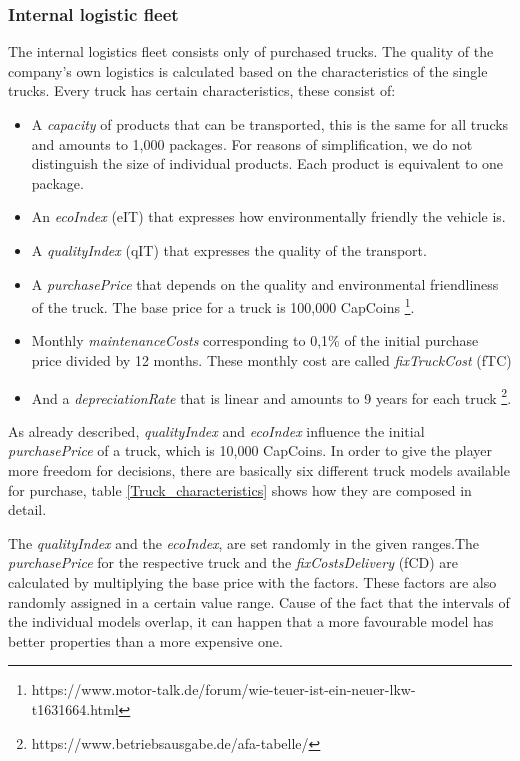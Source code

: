 \subsubsection{Internal logistic fleet}
The internal logistics fleet consists only of purchased trucks. The quality of the company's own logistics is calculated based on the characteristics of the single trucks. Every truck has certain characteristics, these consist of:
\begin{itemize}
    \item A \textit{capacity} of products that can be transported, this is the same for all trucks and amounts to 1,000 packages. For reasons of simplification, we do not distinguish the size of individual products.  Each product is equivalent to one package. 
    \item An \textit{ecoIndex} (\gls{eIT}) that expresses how environmentally friendly the vehicle is.
    \item A \textit{qualityIndex} (\gls{qIT}) that expresses the quality of the transport.
    \item A \textit{purchasePrice} that depends on the quality and environmental friendliness of the truck. The base price for a truck is 100,000 CapCoins 
    \footnote{https://www.motor-talk.de/forum/wie-teuer-ist-ein-neuer-lkw-t1631664.html}.
    \item Monthly \textit{maintenanceCosts} corresponding to 0,1\% of the initial purchase price divided by 12 months. These monthly cost are called \textit{fixTruckCost} (\gls{fTC})
    \item And a \textit{depreciationRate} that is linear and amounts to 9 years for each truck \footnote{https://www.betriebsausgabe.de/afa-tabelle/}.
\end{itemize}

As already described, \textit{qualityIndex} and \textit{ecoIndex} influence the initial \textit{purchasePrice} of a truck, which is 10,000 CapCoins. In order to give the player more freedom for decisions, there are basically six different truck models available for purchase, table \ref{Truck_characteristics} shows how they are composed in detail.

The \textit{qualityIndex} and the \textit{ecoIndex}, are set randomly in the given ranges.The \textit{purchasePrice} for the respective truck and the \textit{fixCostsDelivery} (\gls{fCD}) are calculated by multiplying the base price with the factors. These factors are also randomly assigned in a certain value range. Cause of the fact that the intervals of the individual models overlap, it can happen that a more favourable model has better properties than a more expensive one.

